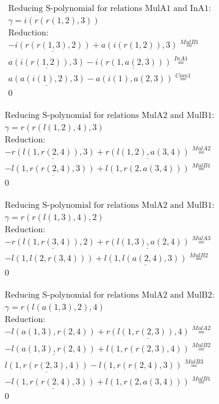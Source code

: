 \documentclass[11pt]{amsart}
\begin{document}
\begin{align*} 
& \text{Reducing S-polynomial for relations MulA1 and InA1:} \\ 
& \gamma = i(r(r(1,2),3)) \\ 
& \text{Reduction}: \\& - \underline{i(r(r(1,3),2))} + a(i(r(1,2)),3) \stackrel{ MulB1 }{=}  \\ 
&\underline{a(i(r(1,2)),3)} - \underline{i(r(1,a(2,3)))} \stackrel{ InA1 }{=}  \\ 
&\underline{a(a(i(1),2),3)} - a(i(1),a(2,3)) \stackrel{ Com1 }{=}  \\ 
&0\\ 
\end{align*} 
 
\begin{align*} 
& \text{Reducing S-polynomial for relations MulA2 and MulB1:} \\ 
& \gamma = r(r(l(1,2),4),3) \\ 
& \text{Reduction}: \\& - \underline{r(l(1,r(2,4)),3)} + \underline{r(l(1,2),a(3,4))} \stackrel{ MulA2 }{=}  \\ 
& - \underline{l(1,r(r(2,4),3))} + l(1,r(2,a(3,4))) \stackrel{ MulB1 }{=}  \\ 
&0\\ 
\end{align*} 
 
\begin{align*} 
& \text{Reducing S-polynomial for relations MulA2 and MulB1:} \\ 
& \gamma = r(r(l(1,3),4),2) \\ 
& \text{Reduction}: \\& - \underline{r(l(1,r(3,4)),2)} + \underline{r(l(1,3),a(2,4))} \stackrel{ MulA3 }{=}  \\ 
& - l(1,l(2,r(3,4))) + \underline{l(1,l(a(2,4),3))} \stackrel{ MulB2 }{=}  \\ 
&0\\ 
\end{align*} 
 
\begin{align*} 
& \text{Reducing S-polynomial for relations MulA2 and MulB2:} \\ 
& \gamma = r(l(a(1,3),2),4) \\ 
& \text{Reduction}: \\& - l(a(1,3),r(2,4)) + \underline{r(l(1,r(2,3)),4)} \stackrel{ MulA2 }{=}  \\ 
& - \underline{l(a(1,3),r(2,4))} + l(1,r(r(2,3),4)) \stackrel{ MulB2 }{=}  \\ 
&\underline{l(1,r(r(2,3),4))} - l(1,r(r(2,4),3)) \stackrel{ MulB3 }{=}  \\ 
& - \underline{l(1,r(r(2,4),3))} + l(1,r(2,a(3,4))) \stackrel{ MulB1 }{=}  \\ 
&0\\ 
\end{align*} 
 
\end{document}
